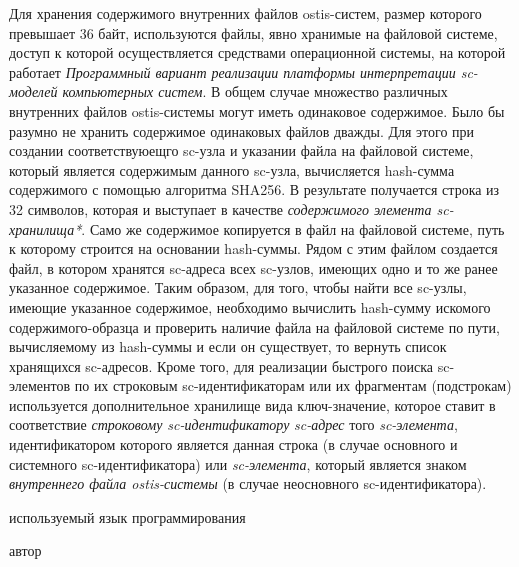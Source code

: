 
Для хранения содержимого внутренних файлов ostis-систем, размер которого превышает 36 байт, используются файлы, явно
хранимые на файловой системе, доступ к которой осуществляется средствами операционной системы, на которой работает
\textit{Программный вариант реализации платформы интерпретации sc-моделей компьютерных систем}. В общем случае множество
различных внутренних файлов ostis-системы могут иметь одинаковое содержимое. Было бы разумно не хранить содержимое
одинаковых файлов дважды. Для этого при создании соответствуюещго sc-узла и указании файла на файловой системе, который
является содержимым данного sc-узла, вычисляется hash-сумма содержимого с помощью алгоритма SHA256. В результате получается
строка из 32 символов, которая и выступает в качестве \textit{содержимого элемента sc-хранилища*}. Само же содержимое
копируется в файл на файловой системе, путь к которому строится на основании hash-суммы. Рядом с этим файлом
создается файл, в котором хранятся sc-адреса всех sc-узлов, имеющих одно и то же ранее указанное содержимое.
Таким образом, для того, чтобы найти все sc-узлы, имеющие указанное содержимое, необходимо вычислить hash-сумму
искомого содержимого-образца и проверить наличие файла на файловой системе по пути, вычисляемому из hash-суммы и если
он существует, то вернуть список хранящихся sc-адресов. Кроме того, для реализации быстрого поиска
sc-элементов по их строковым sc-идентификаторам или их фрагментам (подстрокам) используется дополнительное
хранилище вида ключ-значение, которое ставит в соответствие \textit{строковому sc-идентификатору} \textit{sc-адрес}
того \textit{sc-элемента}, идентификатором которого является данная строка (в случае основного и системного sc-идентификатора)
или \textit{sc-элемента}, который является знаком \textit{внутреннего файла ostis-системы} (в случае неосновного
sc-идентификатора).

\begin{SCn}
\begin{scnrelfromlist}{используемый язык программирования}
\end{scnrelfromlist}
\begin{scnrelfromlist}{автор}
\end{scnrelfromlist}
\end{SCn}

